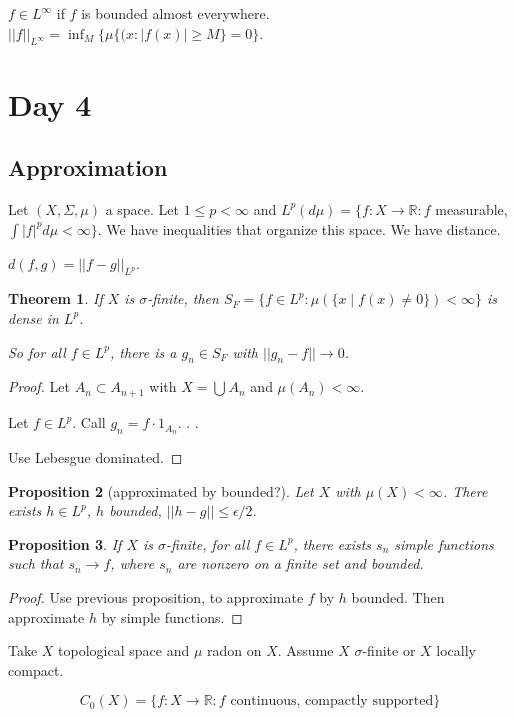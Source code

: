 \documentclass[11pt]{article}
\newtheorem{thm}{Theorem}[section]
\newtheorem{prop}[thm]{Proposition}
\newcommand{\mb}[1]{\mbox{#1}}
\newcommand{\ra}{\rightarrow}
\newcommand{\sbs}{\subset}
\newcommand{\ep}{\epsilon}
\newcommand{\si}{\sigma}
\newcommand{\bcu}[2]{\bigcup_{#1}^{#2}}
\newcommand{\re}{\mathbb{R}}
\begin{document}
$f\in L^{\infty}$ if $f$ is bounded almost everywhere. $||f||_{L^{\infty}}=\inf_M\{\mu\{(x: |f(x)|\ge M\}=0\}$. 

\section{Day 4} 

\subsection{Approximation}

Let $(X,\Sigma,\mu)$ a space. Let $1\le p<\infty$ and $L^p(d\mu)=\{f:X\ra\re: f$ measurable, $\int|f|^pd\mu<\infty\}$. We have inequalities that organize this space. We have distance. 

$d(f,g)=||f-g||_{L^p}$.

\begin{thm}
If $X$ is $\si$-finite, then $S_F=\{f\in L^p:\mu(\{x\mid f(x)\neq 0\})<\infty\}$ is dense in $L^p$. 

So for all $f\in L^p$, there is a $g_n\in S_F$ with $||g_n-f||\ra 0$. 
\end{thm}
\begin{proof}
Let $A_n\sbs A_{n+1}$ with $X=\bcu{}{}A_n$ and $\mu(A_n)<\infty$. 

Let $f\in L^p$. Call $g_n=f\cdot 1_{A_n}$. . . 

Use Lebesgue dominated. 

\end{proof}

\begin{prop}[approximated by bounded?]
Let $X$ with $\mu(X)<\infty$. There exists $h\in L^p$, $h$ bounded, $||h-g||\le \ep/2$. 

\end{prop}

\begin{prop}
If $X$ is $\si$-finite, for all $f\in L^p$, there exists $s_n$ simple functions such that $s_n\ra f$, where $s_n$ are nonzero on a finite set and bounded. 
\end{prop}
\begin{proof}
Use previous proposition, to approximate $f$ by $h$ bounded. Then approximate $h$ by simple functions. 
\end{proof}

Take $X$ topological space and $\mu$ radon on $X$. Assume $X$ $\si$-finite or $X$ locally compact. 

\[C_0(X)=\{f:X\ra\re: f\mb{ continuous, compactly supported}\}\]
\end{document}
